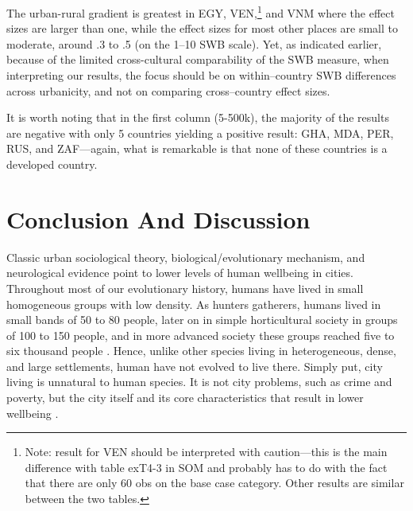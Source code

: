 \documentclass[10pt, letterpaper]{article}
\begin{document}
The urban-rural gradient is greatest in EGY, VEN,\footnote{Note: result for VEN
  should be interpreted with caution---this is the main difference with table
  exT4-3 in SOM and probably has to do with the fact that there are only 60 obs on the base case category. Other results are
  similar between the two tables.} and VNM where the effect sizes are larger than one, while the effect sizes for most other places are small to moderate, around .3 to .5 (on the 1--10 SWB scale).   
Yet, as indicated earlier, because of the limited cross-cultural comparability of the SWB measure, when interpreting our results, the focus should be on within--country SWB differences across urbanicity, and not on comparing cross--country effect sizes.

It is worth noting that in the first column (5-500k), the majority of the results are
negative with only 5 countries yielding a positive result: GHA, MDA, PER, RUS,
and ZAF---again, what is remarkable is that none of these countries is a
developed country.


\section*{Conclusion And Discussion}

Classic urban sociological theory,
biological/evolutionary mechanism, and neurological evidence point to lower
levels of human wellbeing in cities.
% 
Throughout most of our evolutionary history, humans have lived in small homogeneous groups with low density. As hunters gatherers, humans lived in small bands of 50 to 80 people, later on in simple horticultural society in groups of 100 to 150 people, and in more advanced society these groups reached five to six thousand people \citep{maryanski92}. Hence, unlike other species %
living in heterogeneous, dense, and large settlements, human have not evolved to
live there. Simply put, city living is unnatural to human species. 
%
It is not city problems, such as crime and poverty, but the city itself and its
core characteristics that result in lower wellbeing
\citep{aok_brfss_city_cize16}.  %
\end{document}
